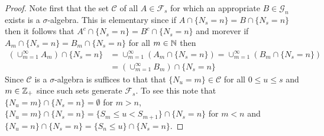 \begin{proof}
Note first that the set $\mathcal{C}$ of all $A \in \mathcal{F}_s$ for which an
appropriate $B \in \mathcal{G}_n$ exists is a $\sigma$-algebra.  This
is elementary since if $A \cap \lbrace N_s = n \rbrace = B \cap \lbrace
N_s = n \rbrace$ then it follows that $A^c \cap \lbrace N_s = n \rbrace = B^c \cap \lbrace
N_s = n \rbrace$ and morever if $A_m \cap \lbrace N_s = n \rbrace = B_m \cap \lbrace
N_s = n \rbrace$ for all $m \in \mathbb{N}$ then 
\begin{align*}
  \left(\cup_{m=1}^\infty A_m \right) \cap \lbrace N_s = n \rbrace
  &=
    \cup_{m=1}^\infty
    \left(A_m
    \cap
    \lbrace
    N_s
    = n
    \rbrace\right)
    =
    \cup_{m=1}^\infty
    \left(B_m
    \cap
    \lbrace
    N_s
    = n
    \rbrace\right) \\
  &=
    \left
    (\cup_{m=1}^\infty
    B_m\right)
    \cap
    \lbrace
    N_s = n \rbrace
\end{align*}
Since $\mathcal{C}$ is a $\sigma$-algebra is suffices to that that
$\lbrace N_u = m \rbrace \in \mathcal{C}$ for all $0 \leq u \leq s$
and $m \in \mathbb{Z}_+$ since such sets generate $\mathcal{F}_s$.  To
see this note that $\lbrace N_u = m \rbrace
\cap \lbrace N_s = n \rbrace = \emptyset$ for $m > n$, $\lbrace N_u = m \rbrace
\cap \lbrace N_s = n \rbrace = \lbrace S_m \leq u < S_{m+1} \rbrace
\cap \lbrace N_s = n \rbrace$ for $m < n$ and $\lbrace N_u = n \rbrace
\cap \lbrace N_s = n \rbrace = \lbrace S_n \leq u \rbrace
\cap \lbrace N_s = n \rbrace$.


\end{proof}
